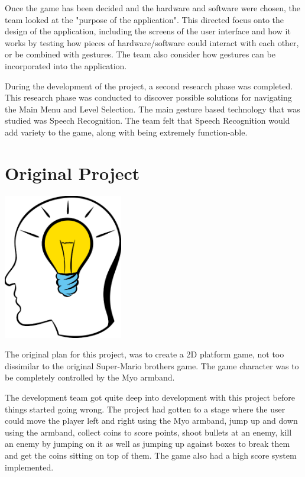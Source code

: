 \documentclass{article}
\begin{document}
\bigskip

Once the game has been decided and the hardware and software were chosen, the team looked at the "purpose of the application". This directed focus onto the design of the application, including the screens of the user interface and how it works by testing how pieces of
hardware/software could interact with each other, or be combined with gestures. The team also consider how gestures can be incorporated
into the application.

\bigskip

During the development of the project, a second research phase was completed. This research phase was conducted to discover possible solutions for navigating the Main Menu and Level Selection. The main gesture based technology that was studied was Speech Recognition. The team felt that Speech Recognition would add variety to the game, along with being extremely function-able.

\section{Original Project}
\includegraphics[width=\textwidth, height=180pt]{img/OriginalIdea.PNG}

\bigskip
The original plan for this project, was to create a 2D platform game, not too dissimilar to the original Super-Mario brothers game. The game character was to be completely controlled by the Myo armband.

The development team got quite deep into development with this project before things started going wrong. The project had gotten to a stage where the user could move the player left and right using the Myo armband, jump up and down using the armband, collect coins to score points, shoot bullets at an enemy, kill an enemy by jumping on it as well as jumping up against boxes to break them and get the coins sitting on top of them. The game also had a high score system implemented.
\bigskip
\end{document}

